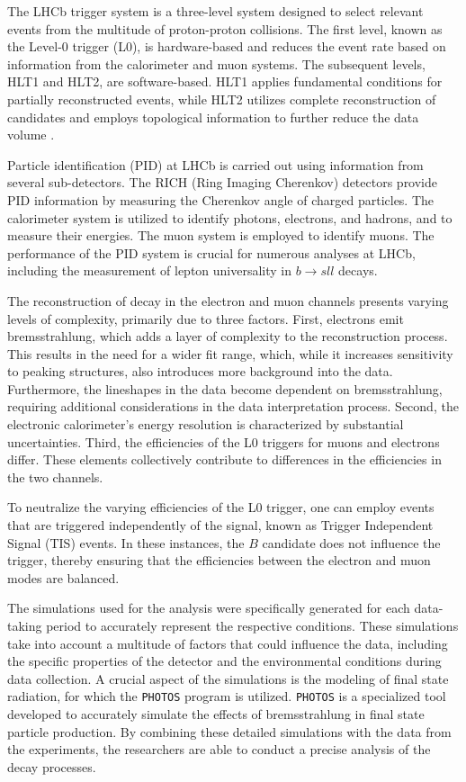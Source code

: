 The LHCb trigger system is a three-level system designed to select relevant events from 
the multitude of proton-proton collisions. The first level, known as the Level-0 trigger 
(L0), is hardware-based and reduces the event rate based on information from the calorimeter 
and muon systems. The subsequent levels, HLT1 and HLT2, are software-based. HLT1 applies 
fundamental conditions for partially reconstructed events, while HLT2 utilizes complete 
reconstruction of candidates and employs topological information to further reduce the 
data volume \cite{trigger}.

Particle identification (PID) at LHCb is carried out using information from several 
sub-detectors. The RICH (Ring Imaging Cherenkov) detectors provide PID information by 
measuring the Cherenkov angle of charged particles. The calorimeter system is utilized 
to identify photons, electrons, and hadrons, and to measure their energies. The muon 
system is employed to identify muons. The performance of the PID system is crucial for 
numerous analyses at LHCb, including the measurement of lepton universality in $b\to sll$ 
decays.

The reconstruction of decay in the electron and muon channels presents varying levels of 
complexity, primarily due to three factors. First, electrons emit bremsstrahlung, which adds
a layer of complexity to the reconstruction process. This results in the need for a wider 
fit range, which, while it increases sensitivity to peaking structures, also introduces 
more background into the data. Furthermore, the lineshapes in the data become 
dependent on bremsstrahlung, requiring additional considerations in the data interpretation 
process. Second, the electronic calorimeter's energy resolution is characterized 
by substantial uncertainties. Third, the efficiencies of the L0 triggers for muons and electrons 
differ. These elements collectively contribute to differences in the efficiencies in 
the two channels. 

To neutralize the varying efficiencies of the L0 trigger, one can employ events that are 
triggered independently of the signal, known as Trigger Independent Signal (TIS) events. 
In these instances, the $B$ candidate does not influence the trigger, thereby ensuring that 
the efficiencies between the electron and muon modes are balanced.

The simulations used for the analysis were specifically generated for each data-taking period 
to accurately represent the respective conditions. These simulations take into account a multitude 
of factors that could influence the data, including the specific properties of the detector and 
the environmental conditions during data collection. A crucial aspect of the simulations is the 
modeling of final state radiation, for which the \texttt{PHOTOS} \cite{PHOTOS} program is utilized. 
\texttt{PHOTOS} is a specialized tool developed to accurately simulate the effects of bremsstrahlung in 
final state particle production. By combining these detailed simulations with the data from the 
experiments, the researchers are able to conduct a precise analysis of the decay processes.

